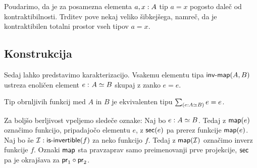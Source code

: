 Poudarimo, da je za posamezna elementa \(a, x : A\) tip \(a = x\) pogosto daleč od kontraktibilnosti. Trditev pove nekaj veliko šibkejšega, namreč, da je kontraktibilen totalni prostor vseh tipov \(a = x\).

\subsection{Konstrukcija}

Sedaj lahko predstavimo karakterizacijo. Vsakemu elementu tipa \(\textnormal{\textsf{inv-map}}(A, B)\) ustreza enoličen element \(e \,\colon A \simeq B\) skupaj z zanko \(e = e\).

\begin{trditev}
  \label{main-char}
  Tip obrnljivih funkcij med \(A\) in \(B\) je ekvivalenten tipu \(\textstyle \sum_{\left( e : A \simeq B \right)} e = e\).
\end{trditev}

Za boljšo berljivost vpeljemo sledeče oznake: Naj bo \(e : A \simeq B\). Tedaj z \(\textnormal{\textsf{map}}(e)\) označimo funkcijo, pripadajočo elementu \(e\), z \(\textnormal{\textsf{sec}}(e)\) pa prerez funkcije \(\textnormal{\textsf{map}}(e)\). Naj bo še \(\mathcal{I} : \textnormal{\textsf{is-invertible}}(f)\) za neko funkcijo \(f\). Tedaj z \(\textnormal{\textsf{map}}(\mathcal{I})\) označimo inverz funkcije \(f\). Oznaki \(\textnormal{\textsf{map}}\) sta pravzaprav samo preimenovanji prve projekcije, \(\textnormal{\textsf{sec}}\) pa je okrajšava za \(\textnormal{\textsf{pr}}_{1} \circ \textnormal{\textsf{pr}}_{2}\).


